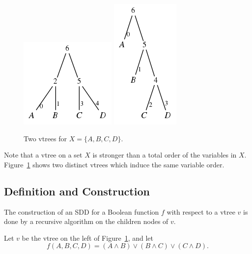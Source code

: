 \documentclass[11pt]{report}
\begin{document}
\begin{figure}
\centering
\includegraphics[scale=0.5]{balancedABCD.png}
\qquad
\includegraphics[scale=0.5]{rightlinearABCD.png}


\caption{Two vtrees for $X = \{A, B, C, D\}.$}
\label{fig:vtree_examples} 

\end{figure}
Note that a vtree on a set $X$ is stronger than a total order of the variables in $X$. Figure~\ref{fig:vtree_examples} shows two distinct vtrees which induce the same variable order. 

\subsection{Definition and Construction}

The construction of an SDD for a Boolean function $f$ with respect to a vtree $v$ is done by a recursive algorithm on the children nodes of $v$. 

Let $v$ be the vtree on the left of Figure~\ref{fig:vtree_examples}, and let $$f(A, B, C, D) = (A \land B) \lor (B \land C) \lor (C \land D).$$
\end{document}
